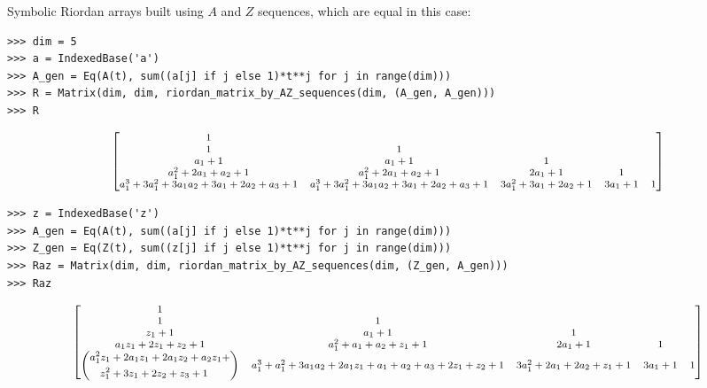 \begin{example}
Symbolic Riordan arrays built using $A$ and $Z$ sequences, which are equal in this case:
\begin{verbatim}
>>> dim = 5
>>> a = IndexedBase('a')
>>> A_gen = Eq(A(t), sum((a[j] if j else 1)*t**j for j in range(dim)))
>>> R = Matrix(dim, dim, riordan_matrix_by_AZ_sequences(dim, (A_gen, A_gen)))
>>> R
\end{verbatim}
\begin{displaymath}
\footnotesize
\left[\begin{matrix}1 &   &   &   &  \\1 & 1 &   &   &  \\a_{1} + 1 & a_{1} + 1 & 1 &   &  \\a_{1}^{2} + 2 a_{1} + a_{2} + 1 & a_{1}^{2} + 2 a_{1} + a_{2} + 1 & 2 a_{1} + 1 & 1 &  \\a_{1}^{3} + 3 a_{1}^{2} + 3 a_{1} a_{2} + 3 a_{1} + 2 a_{2} + a_{3} + 1 & a_{1}^{3} + 3 a_{1}^{2} + 3 a_{1} a_{2} + 3 a_{1} + 2 a_{2} + a_{3} + 1 & 3 a_{1}^{2} + 3 a_{1} + 2 a_{2} + 1 & 3 a_{1} + 1 & 1\end{matrix}\right]
\end{displaymath}
\begin{verbatim}
>>> z = IndexedBase('z')
>>> A_gen = Eq(A(t), sum((a[j] if j else 1)*t**j for j in range(dim)))
>>> Z_gen = Eq(Z(t), sum((z[j] if j else 1)*t**j for j in range(dim)))
>>> Raz = Matrix(dim, dim, riordan_matrix_by_AZ_sequences(dim, (Z_gen, A_gen)))
>>> Raz
\end{verbatim}
\begin{displaymath}
\footnotesize
\left[\begin{matrix}1 &   &   &   &  \\1 & 1 &   &   &  \\z_{1} + 1 & a_{1} + 1 & 1 &   &  \\a_{1} z_{1} + 2 z_{1} + z_{2} + 1 & a_{1}^{2} + a_{1} + a_{2} + z_{1} + 1 & 2 a_{1} + 1 & 1 &  \\ \left(\begin{split} a_{1}^{2} z_{1} &+ 2 a_{1} z_{1} + 2 a_{1} z_{2} + a_{2} z_{1} +\\ z_{1}^{2} &+ 3 z_{1} + 2 z_{2} + z_{3} + 1\end{split}\right) & a_{1}^{3} + a_{1}^{2} + 3 a_{1} a_{2} + 2 a_{1} z_{1} + a_{1} + a_{2} + a_{3} + 2 z_{1} + z_{2} + 1 & 3 a_{1}^{2} + 2 a_{1} + 2 a_{2} + z_{1} + 1 & 3 a_{1} + 1 & 1\end{matrix}\right]
\end{displaymath}

\end{example}
